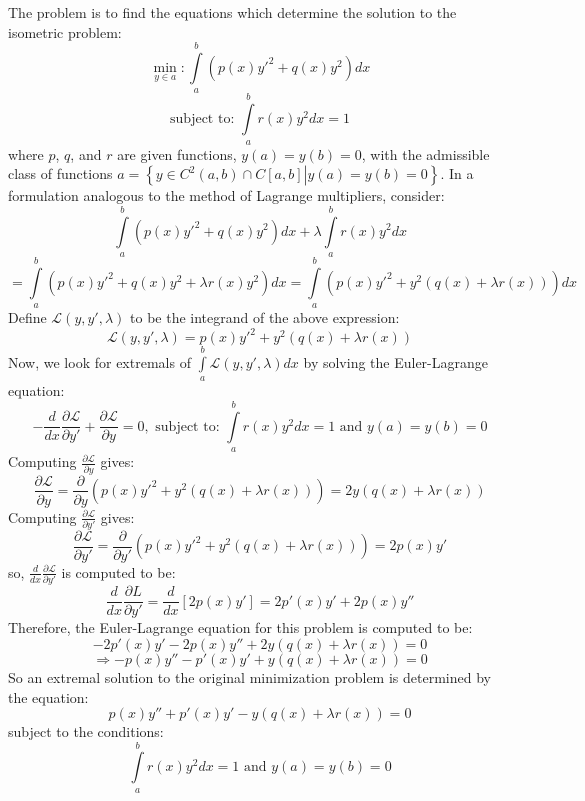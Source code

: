 \begin{homeworkProblem}
The problem is to find the equations which determine the solution to the isometric problem:
\[\mathop {\min }\limits_{y \in a} :\int\limits_a^b {\left( {p\left( x \right){{y'}^2} + q\left( x \right){y^2}} \right)dx} \]
\[
{\text{subject to: }}\int\limits_a^b {r\left( x \right)y^2 dx}  = 1
\]
where $p$, $q$, and $r$ are given functions, $y(a)=y(b)=0$, with the admissible class of functions $a = \left\{ {\left. {y \in {C^2}\left( {a,b} \right) \cap C\left[ {a,b} \right]} \right|y\left( a \right) = y\left( b \right) = 0} \right\}$.
In a formulation analogous to the method of Lagrange multipliers, consider:
\[\int\limits_a^b {\left( {p\left( x \right){{y'}^2} + q\left( x \right){y^2}} \right)dx}  + \lambda \int\limits_a^b {r\left( x \right){y^2}dx} \]
\[ = \int\limits_a^b {\left( {p\left( x \right){{y'}^2} + q\left( x \right){y^2} + \lambda r\left( x \right){y^2}} \right)dx}  = \int\limits_a^b {\left( {p\left( x \right){{y'}^2} + {y^2}\left( {q\left( x \right) + \lambda r\left( x \right)} \right)} \right)dx} \]
Define  $\mathscr{L}\left( {y,y',\lambda } \right)$ to be the integrand of the above expression:
\[\mathscr{L}\left( {y,y',\lambda } \right) = p\left( x \right){{y'}^2} + {y^2}\left( {q\left( x \right) + \lambda r\left( x \right)} \right)\]
Now, we look for extremals of $\int\limits_a^b {\mathscr{L}\left( {y,y',\lambda } \right)dx} $ by solving the Euler-Lagrange equation:
\[ - \frac{d}{{dx}}\frac{{\partial \mathscr{L}}}{{\partial y'}} + \frac{{\partial \mathscr{L}}}{{\partial y}} = 0,{\text{ subject to: }}\int\limits_a^b {r\left( x \right){y^2}dx}  = 1{\text{ and }}y\left( a \right) = y\left( b \right) = 0\]
Computing $\frac{{\partial \mathscr{L}}}{{\partial y}}$ gives:
\[\frac{{\partial \mathscr{L}}}{{\partial y}} = \frac{\partial }{{\partial y}}\left( {p\left( x \right){{y'}^2} + {y^2}\left( {q\left( x \right) + \lambda r\left( x \right)} \right)} \right) = 2y\left( {q\left( x \right) + \lambda r\left( x \right)} \right)\]
Computing $\frac{{\partial \mathscr{L}}}{{\partial y'}}$ gives:
\[\frac{{\partial \mathscr{L}}}{{\partial y'}} = \frac{\partial }{{\partial y'}}\left( {p\left( x \right){{y'}^2} + {y^2}\left( {q\left( x \right) + \lambda r\left( x \right)} \right)} \right) = 2p\left( x \right)y'\]
so, $\frac{d}{{dx}}\frac{{\partial \mathscr{L}}}{{\partial y'}}$ is computed to be:
\[\frac{d}{{dx}}\frac{{\partial L}}{{\partial y'}} = \frac{d}{{dx}}\left[ {2p\left( x \right)y'} \right] = 2p'\left( x \right)y' + 2p\left( x \right)y''\]
Therefore, the Euler-Lagrange equation for this problem is computed to be:
\[ - 2p'\left( x \right)y' - 2p\left( x \right)y'' + 2y\left( {q\left( x \right) + \lambda r\left( x \right)} \right) = 0\]
\[ \Rightarrow  - p\left( x \right)y'' - p'\left( x \right)y' + y\left( {q\left( x \right) + \lambda r\left( x \right)} \right) = 0\]
So an extremal solution to the original minimization problem is determined by the equation:
\[p\left( x \right)y'' + p'\left( x \right)y' - y\left( {q\left( x \right) + \lambda r\left( x \right)} \right) = 0\]
subject to the conditions:
\[\int\limits_a^b {r\left( x \right){y^2}dx}  = 1{\text{ and }}y\left( a \right) = y\left( b \right) = 0\]
\end{homeworkProblem}

